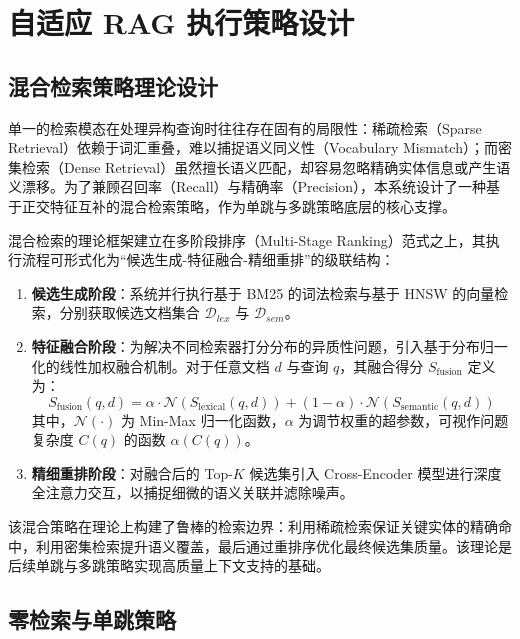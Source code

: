 \section{自适应 RAG 执行策略设计}

\subsection{混合检索策略理论设计}

单一的检索模态在处理异构查询时往往存在固有的局限性：稀疏检索（Sparse Retrieval）依赖于词汇重叠，难以捕捉语义同义性（Vocabulary Mismatch）；而密集检索（Dense Retrieval）虽然擅长语义匹配，却容易忽略精确实体信息或产生语义漂移。为了兼顾召回率（Recall）与精确率（Precision），本系统设计了一种基于正交特征互补的混合检索策略，作为单跳与多跳策略底层的核心支撑。

混合检索的理论框架建立在多阶段排序（Multi-Stage Ranking）范式之上，其执行流程可形式化为“候选生成-特征融合-精细重排”的级联结构：

\begin{enumerate}
    \item \textbf{候选生成阶段}：系统并行执行基于 BM25 的词法检索与基于 HNSW 的向量检索，分别获取候选文档集合 $\mathcal{D}_{lex}$ 与 $\mathcal{D}_{sem}$。
    \item \textbf{特征融合阶段}：为解决不同检索器打分分布的异质性问题，引入基于分布归一化的线性加权融合机制。对于任意文档 $d$ 与查询 $q$，其融合得分 $S_{\text{fusion}}$ 定义为：
    \begin{equation}
    S_{\text{fusion}}(q, d) = \alpha \cdot \mathcal{N}(S_{\text{lexical}}(q, d)) + (1-\alpha) \cdot \mathcal{N}(S_{\text{semantic}}(q, d))
    \end{equation}
    其中，$\mathcal{N}(\cdot)$ 为 Min-Max 归一化函数，$\alpha$ 为调节权重的超参数，可视作问题复杂度 $C(q)$ 的函数 $\alpha(C(q))$。
    \item \textbf{精细重排阶段}：对融合后的 Top-$K$ 候选集引入 Cross-Encoder 模型进行深度全注意力交互，以捕捉细微的语义关联并滤除噪声。
\end{enumerate}

该混合策略在理论上构建了鲁棒的检索边界：利用稀疏检索保证关键实体的精确命中，利用密集检索提升语义覆盖，最后通过重排序优化最终候选集质量。该理论是后续单跳与多跳策略实现高质量上下文支持的基础。

\subsection{零检索与单跳策略}

